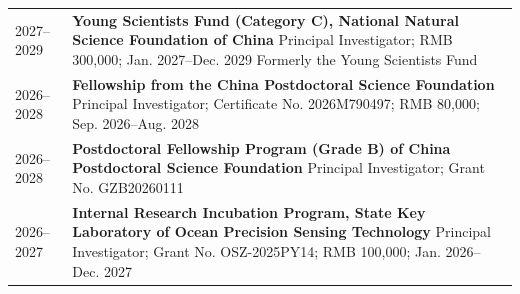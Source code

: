 \begin{longtable}{@{}p{}p{}@{}}

2027--2029 & \textbf{Young Scientists Fund (Category C), National Natural Science Foundation of China}\newline
             Principal Investigator; RMB 300,000; Jan. 2027--Dec. 2029\newline
             Formerly the Young Scientists Fund \\[0.5em]

2026--2028 & \textbf{Fellowship from the China Postdoctoral Science Foundation}\newline
       Principal Investigator; Certificate No. 2026M790497; RMB 80,000; Sep. 2026--Aug. 2028 \\[0.5em]

2026--2028 & \textbf{Postdoctoral Fellowship Program (Grade B) of China Postdoctoral Science Foundation}\newline
       Principal Investigator; Grant No. GZB20260111 \\[0.5em]

2026--2027 & \textbf{Internal Research Incubation Program, State Key Laboratory of Ocean Precision Sensing Technology}\newline
       Principal Investigator; Grant No. OSZ-2025PY14; RMB 100,000; Jan. 2026--Dec. 2027 \\

\end{longtable}
